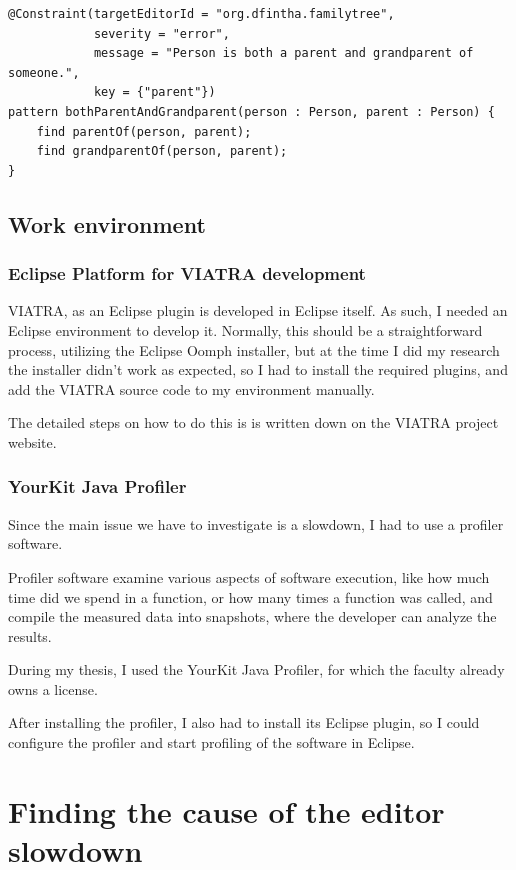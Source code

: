 \documentclass[11pt,a4paper,oneside]{report}
\begin{document}
\begin{lstlisting}[frame=single]
@Constraint(targetEditorId = "org.dfintha.familytree",
            severity = "error",
            message = "Person is both a parent and grandparent of someone.",
            key = {"parent"})
pattern bothParentAndGrandparent(person : Person, parent : Person) {
    find parentOf(person, parent);
    find grandparentOf(person, parent);
}
\end{lstlisting}

\section{Work environment}
\subsection{Eclipse Platform for VIATRA development}
VIATRA, as an Eclipse plugin is developed in Eclipse itself. As such, I needed
an Eclipse environment to develop it. Normally, this should be a straightforward
process, utilizing the Eclipse Oomph installer, but at the time I did my
research the installer didn't work as expected, so I had to install the required
plugins, and add the VIATRA source code to my environment manually.

The detailed steps on how to do this is is written down on the VIATRA project
website.

\subsection{YourKit Java Profiler}
Since the main issue we have to investigate is a slowdown, I had to use a
profiler software.

Profiler software examine various aspects of software execution, like how much
time did we spend in a function, or how many times a function was called, and
compile the measured data into snapshots, where the developer can analyze the
results.

During my thesis, I used the YourKit Java Profiler, for which the faculty
already owns a license.

After installing the profiler, I also had to install its Eclipse plugin, so I
could configure the profiler and start profiling of the software in Eclipse.

\chapter{Finding the cause of the editor slowdown}
\end{document}
